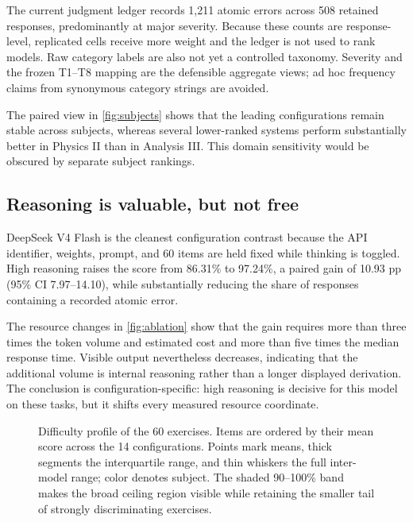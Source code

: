 \documentclass[11pt,a4paper,twocolumn]{article}
\begin{document}
The current judgment ledger records 1,211 atomic errors across 508 retained
responses, predominantly at major severity. Because these counts are
response-level, replicated cells receive more weight and the ledger is not used
to rank models. Raw category labels are also not yet a controlled taxonomy.
Severity and the frozen T1--T8 mapping are the defensible aggregate views; ad
hoc frequency claims from synonymous category strings are avoided.

The paired view in \cref{fig:subjects} shows that the leading configurations
remain stable across subjects, whereas several lower-ranked systems perform
substantially better in Physics II than in Analysis III. This domain
sensitivity would be obscured by separate subject rankings.

\subsection{Reasoning is valuable, but not free}

DeepSeek V4 Flash is the cleanest configuration contrast because the API
identifier, weights, prompt, and 60 items are held fixed while thinking is
toggled. High reasoning raises the score from 86.31\% to 97.24\%, a paired
gain of 10.93 pp (95\% CI 7.97--14.10), while substantially reducing the share
of responses containing a recorded atomic error.

The resource changes in \cref{fig:ablation} show that the gain requires more
than three times the token volume and estimated cost and more than five times
the median response time. Visible output nevertheless decreases, indicating
that the additional volume is internal reasoning rather than a longer displayed
derivation. The conclusion is configuration-specific: high reasoning is
decisive for this model on these tasks, but it shifts every measured resource
coordinate.

\begin{figure}[!t]
\centering
\resizebox{0.95\textwidth}{!}{}
\caption{Difficulty profile of the 60 exercises. Items are ordered by their
mean score across the 14 configurations. Points mark means, thick segments the
interquartile range, and thin whiskers the full inter-model range; color denotes
subject. The shaded 90--100\% band makes the broad ceiling region visible while
retaining the smaller tail of strongly discriminating exercises.}
\label{fig:item-difficulty}
\end{figure}
\end{document}
